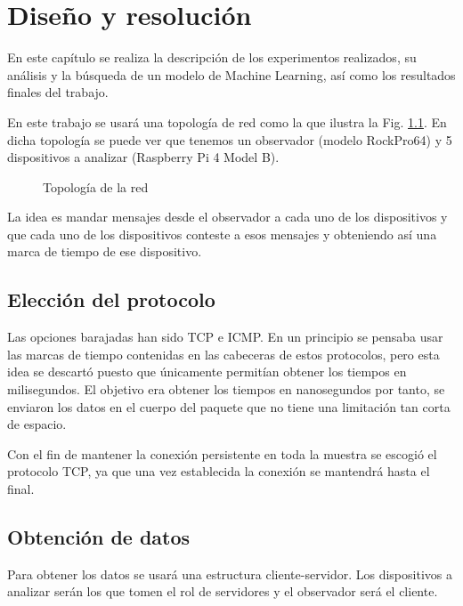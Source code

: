 
\chapter{Diseño y resolución} \label{chap:diseno}

En este capítulo se realiza la descripción de los experimentos realizados, su análisis y la búsqueda de un modelo de Machine Learning, así como los resultados finales del trabajo.

En este trabajo se usará una topología de red como la que ilustra la Fig. \ref{fig:top}. En dicha topología se puede ver que tenemos un observador (modelo RockPro64) y 5 dispositivos a analizar (Raspberry Pi 4 Model B).

\begin{figure}
    \centering
    \resizebox{0.5\textwidth}{!}{
        
    }
    \caption{Topología de la red}
    \label{fig:top}
\end{figure}

La idea es mandar mensajes desde el observador a cada uno de los dispositivos y que cada uno de los dispositivos conteste a esos mensajes y obteniendo así una marca de tiempo de ese dispositivo.

\section{Elección del protocolo}

Las opciones barajadas han sido TCP e ICMP. En un principio se pensaba usar las marcas de tiempo contenidas en las cabeceras de estos protocolos, pero esta idea se descartó puesto que únicamente permitían obtener los tiempos en milisegundos. El objetivo era obtener los tiempos en nanosegundos por tanto, se enviaron los datos en el cuerpo del paquete que no tiene una limitación tan corta de espacio. 

Con el fin de mantener la conexión persistente en toda la muestra se escogió el protocolo TCP, ya que una vez establecida la conexión se mantendrá hasta el final.

\section{Obtención de datos}

Para obtener los datos se usará una estructura cliente-servidor. Los dispositivos a analizar serán los que tomen el rol de servidores y el observador será el cliente.

